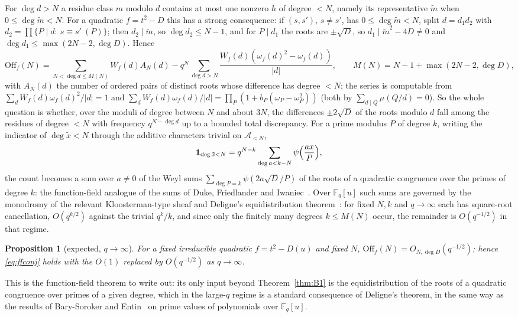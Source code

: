 \documentclass[11pt,a4paper]{article}
\newtheorem{proposition}[theorem]{Proposition}
\newcommand{\F}{\mathbb{F}}
\newcommand{\A}{\mathcal A}
\begin{document}
For $\deg d>N$ a residue class $m$ modulo $d$ contains at most one nonzero $h$ of degree $<N$, namely its
representative $\tilde m$ when $0\le\deg\tilde m<N$. For a quadratic $f=t^2-D$ this has a strong
consequence: if $(s,s')$, $s\ne s'$, has $0\le\deg\tilde m<N$, split $d=d_1d_2$ with
$d_2=\prod\{P\mid d:\ s\equiv s'\ (P)\}$; then $d_2\mid\tilde m$, so $\deg d_2\le N-1$, and for $P\mid d_1$
the roots are $\pm\sqrt D$, so $d_1\mid\tilde m^2-4D\ne0$ and $\deg d_1\le\max(2N-2,\deg D)$. Hence
\[
\mathrm{Off}_f(N)=\sum_{N<\deg d\le M(N)}W_f(d)A_N(d)-q^N\sum_{\deg d>N}\frac{W_f(d)(\omega_f(d)^2-\omega_f(d))}{|d|},
\qquad M(N)=N-1+\max(2N-2,\deg D),
\]
with $A_N(d)$ the number of ordered pairs of distinct roots whose difference has degree $<N$; the series
is computable from $\sum_dW_f(d)\omega_f(d)^2/|d|=1$ and $\sum_dW_f(d)\omega_f(d)/|d|=\prod_P(1+b_P(\omega_P-\omega_P^2))$
(both by $\sum_{d\mid Q}\mu(Q/d)=0$). So the whole question is whether, over the moduli of degree between
$N$ and about $3N$, the differences $\pm2\sqrt D$ of the roots modulo $d$ fall among the residues of degree
$<N$ with frequency $q^{N-\deg d}$ up to a bounded total discrepancy. For a prime modulus $P$ of degree
$k$, writing the indicator of $\deg\tilde x<N$ through the additive characters trivial on $\A_{<N}$,
\[
\mathbf 1_{\deg\tilde x<N}=q^{N-k}\sum_{\deg a<k-N}\psi\Bigl(\frac{ax}{P}\Bigr),
\]
the count becomes a sum over $a\ne0$ of the Weyl sums $\sum_{\deg P=k}\psi(2a\sqrt D/P)$ of the roots of a
quadratic congruence over the primes of degree $k$: the function-field analogue of the sums of Duke,
Friedlander and Iwaniec~\cite{DFI1995}. Over $\F_q[u]$ such sums are governed by the monodromy of the
relevant Kloosterman-type sheaf and Deligne's equidistribution theorem~\cite{Katz1988}: for fixed $N,k$
and $q\to\infty$ each has square-root cancellation, $O(q^{k/2})$ against the trivial $q^k/k$, and since
only the finitely many degrees $k\le M(N)$ occur, the remainder is $O(q^{-1/2})$ in that regime.

\begin{proposition}[expected, $q\to\infty$]\label{prop:B3}
For a fixed irreducible quadratic $f=t^2-D(u)$ and fixed $N$, $\mathrm{Off}_f(N)=O_{N,\deg D}(q^{-1/2})$;
hence \eqref{eq:ffconj} holds with the $O(1)$ replaced by $O(q^{-1/2})$ as $q\to\infty$.
\end{proposition}

This is the function-field theorem to write out: its only input beyond Theorem~\ref{thm:B1} is the
equidistribution of the roots of a quadratic congruence over primes of a given degree, which in the
large-$q$ regime is a standard consequence of Deligne's theorem, in the same way as the results of
Bary-Soroker and Entin~\cite{BarySoroker2012,Entin2016} on prime values of polynomials over $\F_q[u]$.
\end{document}
